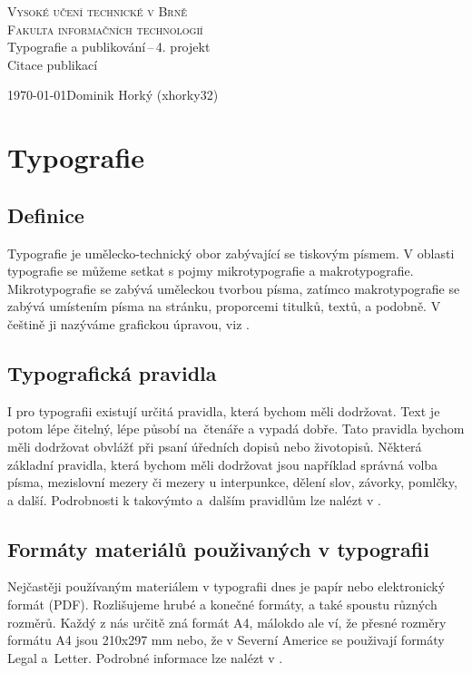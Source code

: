 \documentclass[a4paper, 11pt]{article}
\begin{document}
\begin{titlepage}

\begin{center}
\LARGE
\textsc{\Huge Vysoké učení technické v Brně}\\
\textsc{\huge Fakulta informačních technologií}\\
Typografie a publikování\,--\,4. projekt\\[0.4em]
{\Huge Citace publikací}
\end{center}
{\Large \today \hfill Dominik Horký (xhorky32)}

\end{titlepage}

\section{Typografie}

\subsection{Definice}
Typografie je umělecko-technický obor zabývající se tiskovým písmem. V oblasti typografie se můžeme setkat s pojmy mikrotypografie a makrotypografie. Mikrotypografie se zabývá uměleckou tvorbou písma, zatímco makrotypografie se zabývá umístením písma na stránku, proporcemi titulků, textů, a podobně. V češtině ji nazýváme grafickou úpravou, viz \cite{WikiTypografie}.

\subsection{Typografická pravidla}
I pro typografii existují určitá pravidla, která bychom měli dodržovat. Text je potom lépe čitelný, lépe působí na~čtenáře a vypadá dobře. Tato pravidla bychom měli dodržovat obvlážť při psaní úředních dopisů nebo životopisů. Některá základní pravidla, která bychom měli dodržovat jsou například správná volba písma, mezislovní mezery či mezery u interpunkce, dělení slov, závorky, pomlčky, a další. Podrobnosti k takovýmto a~dalším pravidlům lze nalézt v \cite{TypoPravidla}.

\subsection{Formáty materiálů použivaných v typografii}
Nejčastěji používaným materiálem v typografii dnes je papír nebo elektronický formát (PDF). Rozlišujeme hrubé a konečné formáty, a také spoustu různých rozměrů. Každý z nás určitě zná formát A4, málokdo ale ví, že přesné rozměry formátu A4 jsou 210x297 mm nebo, že v Severní Americe se použivají formáty Legal a~Letter. Podrobné informace lze nalézt v \cite{TypoFormaty}.
\end{document}
